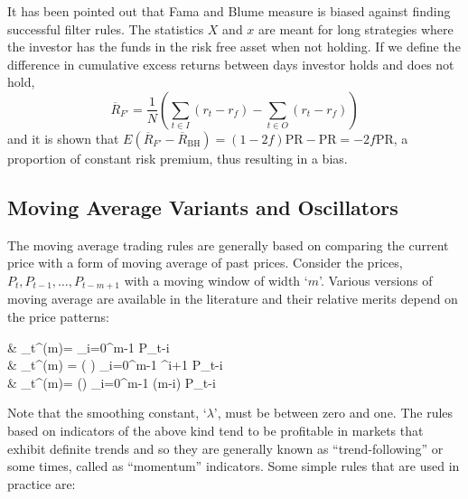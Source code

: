 It has been pointed out that Fama and Blume measure is biased against finding successful filter rules. The statistics $X$ and $x$ are meant for long strategies where the investor has the funds in the risk free asset when not holding. If we define the difference in cumulative excess returns between days investor holds and does not hold,
	\begin{equation} \label{eqn:rfprime}
	\overline{R}_{F'} = \dfrac{1}{N} \left( \sum_{t\in I} (r_t - r_f) - \sum_{t \in O} (r_t - r_f) \right)
	\end{equation}
and it is shown that $E(\overline{R}_{{F}'} - \overline{R}_{\text{BH}}) = (1 - 2f) \text{PR} - \text{PR} = -2f \text{PR}$, a proportion of constant risk premium, thus resulting in a bias.



\subsection{Moving Average Variants and Oscillators}


The moving average trading rules are generally based on comparing the current price with a form of moving average of past prices. Consider the prices, $P_t, P_{t-1}, \ldots, P_{t-m+1}$ with a moving window of width `$m$'. Various versions of moving average are available in the literature and their relative merits depend on the price patterns:
	\begin{flalign}\label{eqn:multi}
	& _t^{(m)}=  \sum_{i=0}^{m-1} P_{t-i} \notag \\
	& _t^{(m)} = \left( \right) \sum_{i=0}^{m-1} \lambda^{i+1} P_{t-i} \\
	&  _t^{(m)}= \left(\right) \sum_{i=0}^{m-1} (m-i) P_{t-i} \notag
	\end{flalign}
Note that the smoothing constant, `$\lambda$', must be between zero and one. The rules based on indicators of the above kind tend to be profitable in markets that exhibit definite trends and so they are generally known as ``trend-following'' or some times, called as ``momentum'' indicators. Some simple rules that are used in practice are: \twomedskip


\noindent{} \twomedskip


